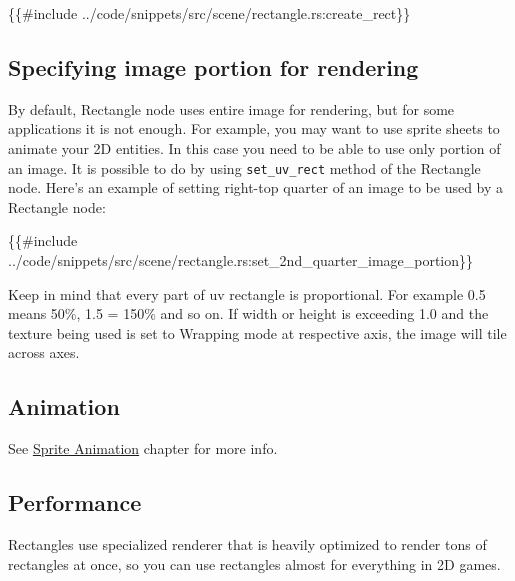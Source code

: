 \documentclass[
]{book}
\newenvironment{Shaded}{\begin{snugshade}}{\end{snugshade}}
\newcommand{\NormalTok}[1]{#1}
\theoremstyle{definition}
\theoremstyle{definition}
\theoremstyle{definition}
\theoremstyle{definition}
\theoremstyle{remark}
\begin{document}
\begin{Shaded}
\begin{Highlighting}[]
\NormalTok{\{\{\#include ../code/snippets/src/scene/rectangle.rs:create\_rect\}\}}
\end{Highlighting}
\end{Shaded}

\subsection{Specifying image portion for rendering}\label{specifying-image-portion-for-rendering}

By default, Rectangle node uses entire image for rendering, but for some applications it is not enough. For example, you may want to use sprite sheets to animate your 2D entities. In this case you need to be able to use only portion of an image. It is possible to do by using \texttt{set\_uv\_rect} method of the Rectangle node. Here's an example of setting right-top quarter of an image to be used by a Rectangle node:

\begin{Shaded}
\begin{Highlighting}[]
\NormalTok{\{\{\#include ../code/snippets/src/scene/rectangle.rs:set\_2nd\_quarter\_image\_portion\}\}}
\end{Highlighting}
\end{Shaded}

Keep in mind that every part of uv rectangle is proportional. For example 0.5 means 50\%, 1.5 = 150\% and so on. If width or height is exceeding 1.0 and the texture being used is set to Wrapping mode at respective axis, the image will tile across axes.

\subsection{Animation}\label{animation-3}

See \href{../animation/spritesheet/spritesheet.md}{Sprite Animation} chapter for more info.

\subsection{Performance}\label{performance-7}

Rectangles use specialized renderer that is heavily optimized to render tons of rectangles at once, so you can use rectangles almost for everything in 2D games.
\end{document}

